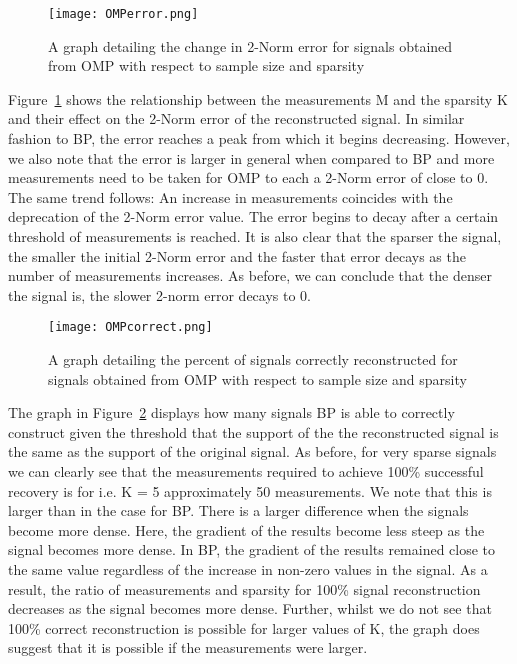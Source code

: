 \documentclass[titlepage,oneside, 12pt]{book}
\theoremstyle{break}
\begin{document}
\begin{figure}[h]
\centering
\centerline{\texttt{[image: OMPerror.png]}}
\caption{A graph detailing the change in 2-Norm error for signals obtained from OMP with respect to sample size and sparsity}
\label{fig:OMPSigError}
\end{figure}


Figure~\ref{fig:OMPSigError} shows the relationship between the measurements M and the sparsity K and their effect on the 2-Norm error of the reconstructed signal. In similar fashion to BP, the error reaches a peak from which it begins decreasing. However, we also note that the error is larger in general when compared to BP and more measurements need to be taken for OMP to each a 2-Norm error of close to 0. The same trend follows: An increase in measurements coincides with the deprecation of the 2-Norm error value. The error begins to decay after a certain threshold of measurements is reached. It is also clear that the sparser the signal, the smaller the initial 2-Norm error and the faster that error decays as the number of measurements increases. As before, we can conclude that the denser the signal is, the slower 2-norm error decays to 0. 


\begin{figure}[h]
\centering
\centerline{\texttt{[image: OMPcorrect.png]}}
\caption{A graph detailing the percent of signals correctly reconstructed for signals obtained from OMP with respect to sample size and sparsity}
\label{fig:OMPSigCorrect}
\end{figure}



The graph in Figure~\ref{fig:OMPSigCorrect} displays how many signals BP is able to correctly construct given the threshold that the support of the the reconstructed signal is the same as the support of the original signal. As before, for very sparse signals we can clearly see that the measurements required to achieve 100\% successful recovery is for i.e. K = 5  approximately 50 measurements. We note that this is larger than in the case for BP. There is a larger difference when the signals become more dense. Here, the gradient of the results become less steep as the signal becomes more dense. In BP, the gradient of the results remained close to the same value regardless of the increase in non-zero values in the signal. As a result, the ratio of measurements and sparsity for 100\% signal reconstruction decreases as the signal becomes more dense. Further, whilst we do not see that 100\% correct reconstruction is possible for larger values of K, the graph does suggest that it is possible if the measurements were larger. 
\end{document}
